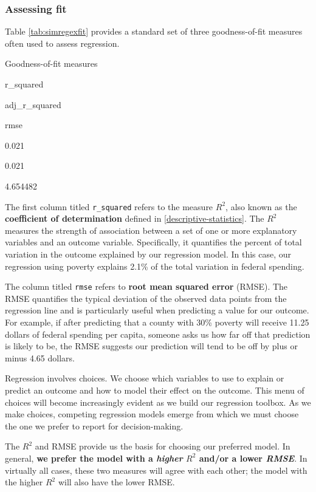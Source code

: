 \documentclass[
]{book}
\begin{document}
\hypertarget{assessing-fit}{%
\subsubsection*{Assessing fit}\label{assessing-fit}}

Table \ref{tab:simregexfit} provides a standard set of three goodness-of-fit measures often used to assess regression.

\label{tab:simregexfit}Goodness-of-fit measures

r\_squared

adj\_r\_squared

rmse

0.021

0.021

4.654482

The first column titled \texttt{r\_squared} refers to the measure \(R^2\), also known as the \textbf{coefficient of determination} defined in \ref{descriptive-statistics}. The \(R^2\) measures the strength of association between a set of one or more explanatory variables and an outcome variable. Specifically, it quantifies the percent of total variation in the outcome explained by our regression model. In this case, our regression using poverty explains 2.1\% of the total variation in federal spending.

The column titled \texttt{rmse} refers to \textbf{root mean squared error} (RMSE). The RMSE quantifies the typical deviation of the observed data points from the regression line and is particularly useful when predicting a value for our outcome. For example, if after predicting that a county with 30\% poverty will receive 11.25 dollars of federal spending per capita, someone asks us how far off that prediction is likely to be, the RMSE suggests our prediction will tend to be off by plus or minus 4.65 dollars.

Regression involves choices. We choose which variables to use to explain or predict an outcome and how to model their effect on the outcome. This menu of choices will become increasingly evident as we build our regression toolbox. As we make choices, competing regression models emerge from which we must choose the one we prefer to report for decision-making.

The \(R^2\) and RMSE provide us the basis for choosing our preferred model. In general, \textbf{we prefer the model with a \emph{higher} \(R^2\) and/or a lower \emph{RMSE}}. In virtually all cases, these two measures will agree with each other; the model with the higher \(R^2\) will also have the lower RMSE.
\end{document}
